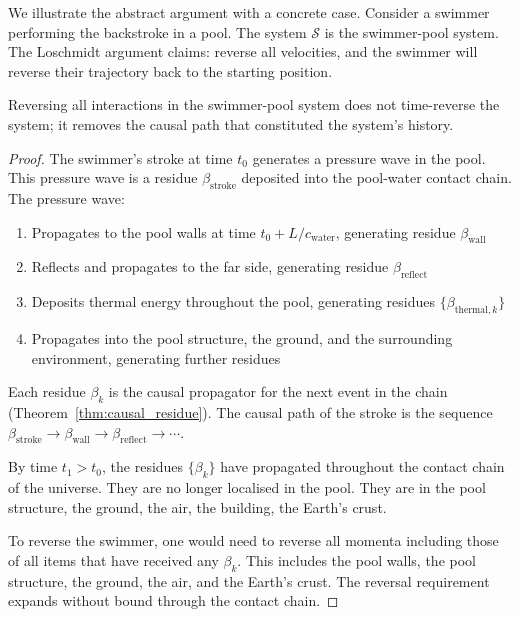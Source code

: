 We illustrate the abstract argument with a concrete case. Consider a swimmer
performing the backstroke in a pool. The system $\mathcal{S}$ is the
swimmer-pool system. The Loschmidt argument claims: reverse all velocities, and
the swimmer will reverse their trajectory back to the starting position.

\begin{theorem}
\label{thm:swimmer}
Reversing all interactions in the swimmer-pool system does not time-reverse the
system; it removes the causal path that constituted the system's history.
\end{theorem}

\begin{proof}
The swimmer's stroke at time $t_0$ generates a pressure wave in the pool. This
pressure wave is a residue $\beta_{\mathrm{stroke}}$ deposited into the
pool-water contact chain. The pressure wave:
\begin{enumerate}
    \item Propagates to the pool walls at time $t_0 + L/c_{\mathrm{water}}$,
          generating residue $\beta_{\mathrm{wall}}$
    \item Reflects and propagates to the far side, generating residue
          $\beta_{\mathrm{reflect}}$
    \item Deposits thermal energy throughout the pool, generating residues
          $\{\beta_{\mathrm{thermal},k}\}$
    \item Propagates into the pool structure, the ground, and the
          surrounding environment, generating further residues
\end{enumerate}
Each residue $\beta_k$ is the causal propagator for the next event in the chain
(Theorem~\ref{thm:causal_residue}). The causal path of the stroke is the
sequence $\beta_{\mathrm{stroke}} \to \beta_{\mathrm{wall}} \to
\beta_{\mathrm{reflect}} \to \cdots$.

By time $t_1 > t_0$, the residues $\{\beta_k\}$ have propagated throughout the
contact chain of the universe. They are no longer localised in the pool. They
are in the pool structure, the ground, the air, the building, the Earth's crust.

To reverse the swimmer, one would need to reverse all momenta including those
of all items that have received any $\beta_k$. This includes the pool walls,
the pool structure, the ground, the air, and the Earth's crust. The reversal
requirement expands without bound through the contact chain.


\end{proof}
